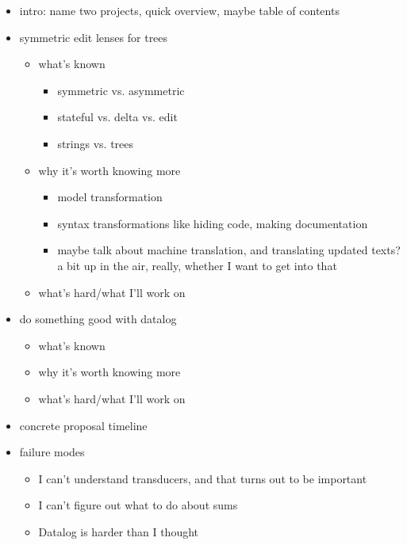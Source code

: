 \documentclass{article}
\begin{document}
\begin{itemize}
    \item intro: name two projects, quick overview, maybe table of contents
    \item symmetric edit lenses for trees
        \begin{itemize}
            \item what's known
                \begin{itemize}
                    \item symmetric vs. asymmetric
                    \item stateful vs. delta vs. edit
                    \item strings vs. trees
                \end{itemize}
            \item why it's worth knowing more
                \begin{itemize}
                    \item model transformation
                    \item syntax transformations like hiding code, making
                        documentation
                    \item maybe talk about machine translation, and
                        translating updated texts? a bit up in the air,
                        really, whether I want to get into that
                \end{itemize}
            \item what's hard/what I'll work on
        \end{itemize}
    \item do something good with datalog
        \begin{itemize}
            \item what's known
            \item why it's worth knowing more
            \item what's hard/what I'll work on
        \end{itemize}
    \item concrete proposal timeline
    \item failure modes
        \begin{itemize}
            \item I can't understand transducers, and that turns out to be
                important
            \item I can't figure out what to do about sums
            \item Datalog is harder than I thought
        \end{itemize}
\end{itemize}
\end{document}
